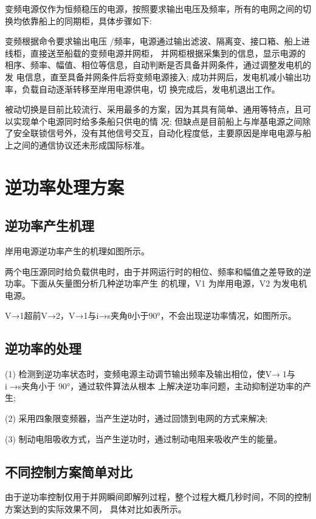 变频电源仅作为恒频稳压的电源，按照要求输出电压及频率，所有的电网之间的切换均依靠船上的同期柜，具体步骤如下:

变频根据命令要求输出电压 /频率，电源通过输出滤波、隔离变、接口箱、船上进线柜，直接送至船载的变频电源并网柜，
并网柜根据采集到的信息，显示电源的相序、频率、幅值、相位等信息，自动判断是否具备并网条件，通过调整发电机的发
电信息，直至具备并网条件后将变频电源接入; 成功并网后，发电机减小输出功率，负载自动逐渐转移至岸用电源供电，切
换完成后，发电机退出工作。

被动切换是目前比较流行、采用最多的方案，因为其具有简单、通用等特点，且可以实现单个电源同时给多条船只供电的情
况; 但缺点是目前船上与岸基电源之间除了安全联锁信号外，没有其他信号交互，自动化程度低，主要原因是岸电电源与船
上之间的通信协议还未形成国际标准。

\section{逆功率处理方案}

\subsection{逆功率产生机理}

岸用电源逆功率产生的机理如图所示。

两个电压源同时给负载供电时，由于并网运行时的相位、频率和幅值之差导致的逆功率。下面从矢量图分析几种逆功率产生
的机理，V1 为岸用电源，V2 为发电机电源。

V→1超前V→2，V→1与i→s夹角θ小于90°，不会出现逆功率情况，如图所示。

\subsection{逆功率的处理}

(1) 检测到逆功率状态时，变频电源主动调节输出频率及输出相位，使V→1与i→s夹角小于 90°，通过软件算法从根本
上解决逆功率问题，主动抑制逆功率的产生;

(2) 采用四象限变频器，当产生逆功时，通过回馈到电网的方式来解决;

(3) 制动电阻吸收方式，当产生逆功时，通过制动电阻来吸收产生的能量。

\subsection{不同控制方案简单对比}

由于逆功率控制仅用于并网瞬间即解列过程，整个过程大概几秒时间，不同的控制方案达到的实际效果不同，
具体对比如表所示。

